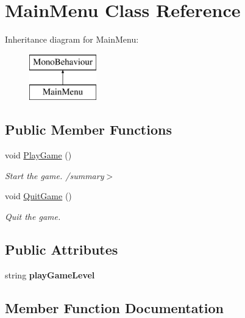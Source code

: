 \hypertarget{class_main_menu}{}\section{Main\+Menu Class Reference}
\label{class_main_menu}
Inheritance diagram for Main\+Menu\+:\begin{figure}[H]
\begin{center}
\leavevmode
\includegraphics[height=2.000000cm]{class_main_menu}
\end{center}
\end{figure}
\subsection*{Public Member Functions}
\begin{DoxyCompactItemize}
\item 
\hypertarget{class_main_menu_a11d7e3cd6b90cf59659e03e830e02db5}{}\label{class_main_menu_a11d7e3cd6b90cf59659e03e830e02db5} 
void \hyperlink{class_main_menu_a11d7e3cd6b90cf59659e03e830e02db5}{Play\+Game} ()
\begin{DoxyCompactList}\small\item\em Start the game. /summary$>$ \end{DoxyCompactList}\item 
void \hyperlink{class_main_menu_a485db7cf60c0b93ecc87b9273bcce78b}{Quit\+Game} ()
\begin{DoxyCompactList}\small\item\em Quit the game. \end{DoxyCompactList}\end{DoxyCompactItemize}
\subsection*{Public Attributes}
\begin{DoxyCompactItemize}
\item 
\hypertarget{class_main_menu_ad4daf453383029abe0f2bdd295662779}{}\label{class_main_menu_ad4daf453383029abe0f2bdd295662779} 
string {\bfseries play\+Game\+Level}
\end{DoxyCompactItemize}


\subsection{Member Function Documentation}
\hypertarget{class_main_menu_a485db7cf60c0b93ecc87b9273bcce78b}{}\label{class_main_menu_a485db7cf60c0b93ecc87b9273bcce78b} 
